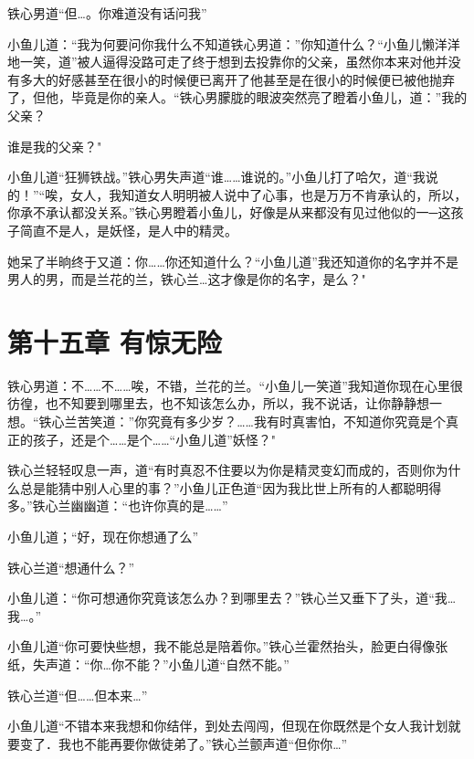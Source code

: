 \documentclass[12pt,oneside]{book}
\begin{document}
铁心男道``但\ldots。你难道没有话问我''

小鱼儿道：``我为何要问你我什么不知道铁心男道：''你知道什么？``小鱼儿懒洋洋地一笑，道''被人逼得没路可走了终于想到去投靠你的父亲，虽然你本来对他并没有多大的好感甚至在很小的时候便已离开了他甚至是在很小的时候便已被他抛弃了，但他，毕竟是你的亲人。``铁心男朦胧的眼波突然亮了瞪着小鱼儿，道：''我的父亲？

谁是我的父亲？"

小鱼儿道``狂狮铁战。''铁心男失声道``谁\ldots\ldots 谁说的。''小鱼儿打了哈欠，道``我说的！''``唉，女人，我知道女人明明被人说中了心事，也是万万不肯承认的，所以，你承不承认都没关系。''铁心男瞪着小鱼儿，好像是从来都没有见过他似的一─这孩子简直不是人，是妖怪，是人中的精灵。

她呆了半晌终于又道：你\ldots\ldots 你还知道什么？``小鱼儿道''我还知道你的名字并不是男人的男，而是兰花的兰，铁心兰\ldots 这才像是你的名字，是么？"

\hypertarget{ux7b2cux5341ux4e94ux7ae0-ux6709ux60caux65e0ux9669}{%
\chapter{第十五章
有惊无险}\label{ux7b2cux5341ux4e94ux7ae0-ux6709ux60caux65e0ux9669}}

铁心男道：不\ldots\ldots 不\ldots\ldots 唉，不错，兰花的兰。``小鱼儿一笑道''我知道你现在心里很彷徨，也不知要到哪里去，也不知该怎么办，所以，我不说话，让你静静想一想。``铁心兰苦笑道：''你究竟有多少岁？\ldots\ldots 我有时真害怕，不知道你究竟是个真正的孩子，还是个\ldots\ldots 是个\ldots\ldots{}``小鱼儿道''妖怪？"

铁心兰轻轻叹息一声，道``有时真忍不住要以为你是精灵变幻而成的，否则你为什么总是能猜中别人心里的事？''小鱼儿正色道``因为我比世上所有的人都聪明得多。''铁心兰幽幽道：``也许你真的是\ldots\ldots{}''

小鱼儿道；``好，现在你想通了么''

铁心兰道``想通什么？''

小鱼儿道：``你可想通你究竟该怎么办？到哪里去？''铁心兰又垂下了头，道``我\ldots 我\ldots。''

小鱼儿道``你可要快些想，我不能总是陪着你。''铁心兰霍然抬头，脸更白得像张纸，失声道：``你\ldots 你不能？''小鱼儿道``自然不能。''

铁心兰道``但\ldots\ldots 但本来\ldots{}''

小鱼儿道``不错本来我想和你结伴，到处去闯闯，但现在你既然是个女人我计划就要变了．我也不能再要你做徒弟了。''铁心兰颤声道``但你你\ldots{}''
\end{document}
